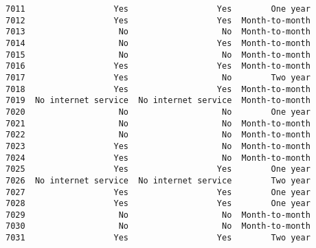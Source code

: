 \documentclass[11pt]{article}
\begin{document}
\begin{tcolorbox}[breakable, boxrule=.5pt, size=fbox, pad at break*=1mm, opacityfill=0]
\begin{Verbatim}[commandchars=\\\{\}]
7011                  Yes                  Yes        One year
7012                  Yes                  Yes  Month-to-month
7013                   No                   No  Month-to-month
7014                   No                  Yes  Month-to-month
7015                   No                   No  Month-to-month
7016                  Yes                  Yes  Month-to-month
7017                  Yes                   No        Two year
7018                  Yes                  Yes  Month-to-month
7019  No internet service  No internet service  Month-to-month
7020                   No                   No        One year
7021                   No                   No  Month-to-month
7022                   No                   No  Month-to-month
7023                  Yes                   No  Month-to-month
7024                  Yes                   No  Month-to-month
7025                  Yes                  Yes        One year
7026  No internet service  No internet service        Two year
7027                  Yes                  Yes        One year
7028                  Yes                  Yes        One year
7029                   No                   No  Month-to-month
7030                   No                   No  Month-to-month
7031                  Yes                  Yes        Two year


\end{Verbatim}
\end{tcolorbox}
\end{document}
